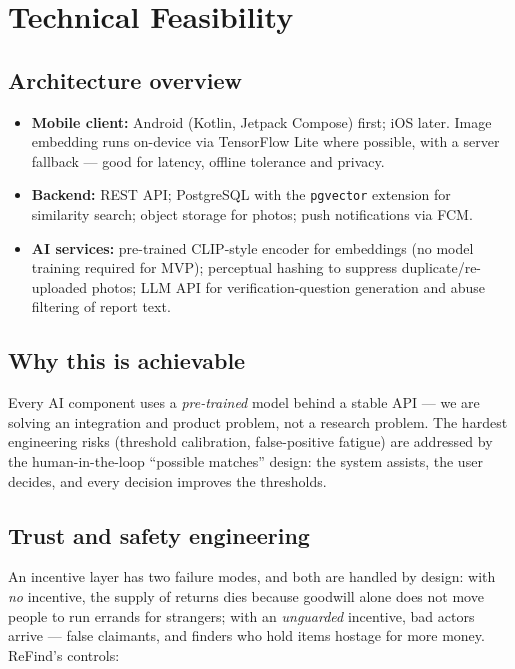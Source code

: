 \documentclass[11pt,a4paper]{article}
\begin{document}
\section{Technical Feasibility}

\subsection{Architecture overview}

\begin{itemize}
  \item \textbf{Mobile client:} Android (Kotlin, Jetpack Compose) first; iOS later. Image
        embedding runs on-device via TensorFlow Lite where possible, with a server fallback
        --- good for latency, offline tolerance and privacy.
  \item \textbf{Backend:} REST API; PostgreSQL with the \texttt{pgvector} extension for
        similarity search; object storage for photos; push notifications via FCM.
  \item \textbf{AI services:} pre-trained CLIP-style encoder for embeddings (no model
        training required for MVP); perceptual hashing to suppress duplicate/re-uploaded
        photos; LLM API for verification-question generation and abuse filtering of report
        text.
\end{itemize}

\subsection{Why this is achievable}

Every AI component uses a \emph{pre-trained} model behind a stable API --- we are solving an
integration and product problem, not a research problem. The hardest engineering risks
(threshold calibration, false-positive fatigue) are addressed by the human-in-the-loop
``possible matches'' design: the system assists, the user decides, and every decision
improves the thresholds.

\subsection{Trust and safety engineering}
\label{sec:safety}

An incentive layer has two failure modes, and both are handled by design: with
\emph{no} incentive, the supply of returns dies because goodwill alone does not move
people to run errands for strangers; with an \emph{unguarded} incentive, bad actors arrive
--- false claimants, and finders who hold items hostage for more money. ReFind's controls:
\end{document}
